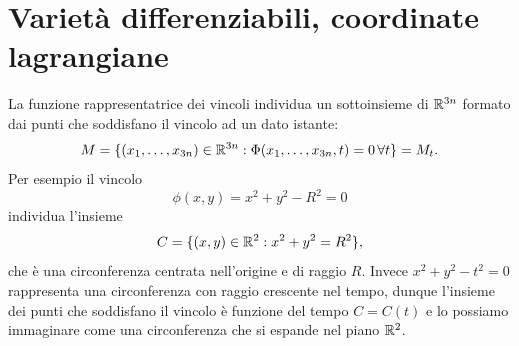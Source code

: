   \section{Varietà differenziabili, coordinate lagrangiane}
    La funzione rappresentatrice dei vincoli individua un sottoinsieme di $\mathbb{R}^{3n}$ formato dai punti che soddisfano il vincolo ad un dato istante:
    \begin{equation}
        M = \{(x_1,\dots,x_{3n}) \in \mathbb{R}^{3n}: \Phi(x_1,\dots,x_{3n},t ) = 0\,\forall t\} = M_t.
    \end{equation}
    Per esempio il vincolo
    \begin{equation}
        \phi(x,y) = x^2+y^2-R^2 = 0
    \end{equation}
    individua l'insieme
    \begin{equation}
        C = \{(x,y)\in \mathbb{R}^2 : x^2+y^2=R^2\},
    \end{equation}
    che è una circonferenza centrata nell'origine e di raggio $R$. Invece $x^2+y^2-t^2=0$ rappresenta una circonferenza con raggio crescente nel tempo, dunque l'insieme dei punti che soddisfano il vincolo è funzione del tempo $C=C(t)$ e lo possiamo immaginare come una circonferenza che si espande nel piano $\mathbb{R}^2$.
    
